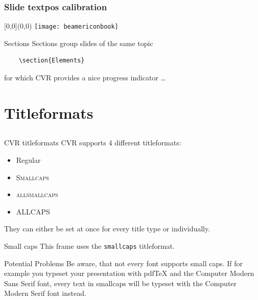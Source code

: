 \documentclass[10pt, fleqn, dvipsnames]{beamer}
\newlength{\slidew}
\newlength{\slideh}
\begin{document}
\begin{frame}
\frametitle{Slide textpos calibration}
\begin{textblock*}{\slidew}[0,0](0\slidew,0\slideh)
\texttt{[image: beamericonbook]}
\end{textblock*}
\end{frame}


\begin{frame}[fragile]{Sections}
  Sections group slides of the same topic

  \begin{verbatim}    \section{Elements}\end{verbatim}

  for which CVR provides a nice progress indicator \ldots
\end{frame}


\section{Titleformats}
\subsection{}  %


\begin{frame}{CVR titleformats}
	CVR supports 4 different titleformats:
	\begin{itemize}
		\item Regular
		\item \textsc{Smallcaps}
		\item \textsc{allsmallcaps}
		\item ALLCAPS
	\end{itemize}
	They can either be set at once for every title type or individually.
\end{frame}


\begin{frame}{Small caps}
	This frame uses the \texttt{smallcaps} titleformat.

	\begin{alertblock}{Potential Problems}
		Be aware, that not every font supports small caps. If for example you typeset your presentation with pdfTeX and the Computer Modern Sans Serif font, every text in smallcaps will be typeset with the Computer Modern Serif font instead.
	\end{alertblock}
\end{frame}
\end{document}
